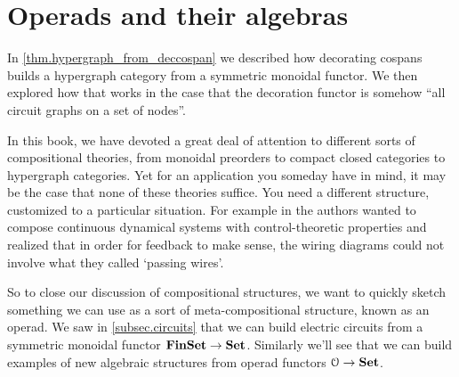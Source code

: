\documentclass[7Sketches]{subfiles}
\begin{document}
%
%

%
\section{Operads and their algebras}%
In \cref{thm.hypergraph_from_deccospan} we described how decorating cospans
builds a hypergraph category from a symmetric monoidal functor. We then explored
how that works in the case that the decoration functor is somehow ``all circuit
graphs on a set of nodes''.

In this book, we have devoted a great deal of attention to different sorts of
compositional theories, from monoidal preorders to compact closed categories to
hypergraph categories. Yet for an application you someday have in mind, it may
be the case that none of these theories suffice. You need a different structure,
customized to a particular situation. For example in \cite{Vagner.Spivak.Lerman:2015a} the
authors wanted to compose continuous dynamical systems with control-theoretic properties
and realized that in order for feedback to make sense, the wiring diagrams could
not involve what they called `passing wires'.%

So to close our discussion of compositional structures, we want to quickly
sketch something we can use as a sort of meta-compositional structure, known as
an operad. We saw in \cref{subsec.circuits} that we can build electric circuits
from a symmetric monoidal functor $\mathbf{FinSet}\to\mathbf{Set}$. Similarly we'll see that
we can build examples of new algebraic structures from operad functors
$\mathcal{O}\to\mathbf{Set}$.
\end{document}
